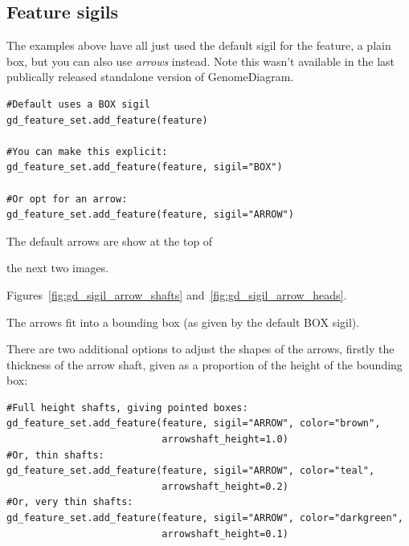\documentclass{report}
\begin{document}
\subsection{Feature sigils}
\label{sec:gd_arrow_sigils}

The examples above have all just used the default sigil for the feature, a
plain box, but you can also use \emph{arrows} instead.  Note this wasn't
available in the last publically released standalone version of
GenomeDiagram.

\begin{verbatim}
#Default uses a BOX sigil
gd_feature_set.add_feature(feature)

#You can make this explicit:
gd_feature_set.add_feature(feature, sigil="BOX")

#Or opt for an arrow:
gd_feature_set.add_feature(feature, sigil="ARROW")
\end{verbatim}

The default arrows are show at the top of
\begin{htmlonly}
the next two images.
\end{htmlonly}
\begin{latexonly}
Figures~\ref{fig:gd_sigil_arrow_shafts} and~\ref{fig:gd_sigil_arrow_heads}.
\end{latexonly}
The arrows fit into a bounding box (as given by the default BOX sigil).

There are two additional options to adjust the shapes of the arrows, firstly
the thickness of the arrow shaft, given as a proportion of the height of the
bounding box:

\begin{verbatim}
#Full height shafts, giving pointed boxes:
gd_feature_set.add_feature(feature, sigil="ARROW", color="brown",
                           arrowshaft_height=1.0)
#Or, thin shafts:                      
gd_feature_set.add_feature(feature, sigil="ARROW", color="teal",
                           arrowshaft_height=0.2)
#Or, very thin shafts:
gd_feature_set.add_feature(feature, sigil="ARROW", color="darkgreen",
                           arrowshaft_height=0.1)
\end{verbatim}
\end{document}
